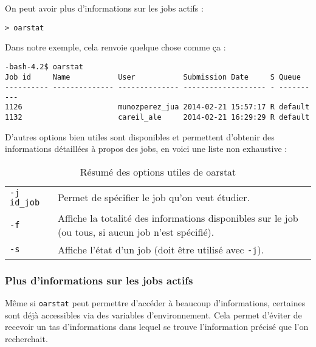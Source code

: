 \par On peut avoir plus d'informations sur les jobs actifs :
\begin{verbatim}
> oarstat
\end{verbatim}

\par Dans notre exemple, cela renvoie quelque chose comme ça :
\begin{verbatim}
-bash-4.2$ oarstat
Job id     Name           User           Submission Date     S Queue
---------- -------------- -------------- ------------------- - ----------
1126                      munozperez_jua 2014-02-21 15:57:17 R default   
1132                      careil_ale     2014-02-21 16:29:29 R default   
\end{verbatim}

\par D'autres options bien utiles sont disponibles et permettent d'obtenir des informations détaillées à propos des jobs, en voici une liste non exhaustive : \\

\begin{table}[h!]
  \centering

  \begin{tabular}{|lp{10cm}|}
\hline
    \texttt{-j id\_job} & Permet de spécifier le job qu'on veut étudier. \\
    \texttt{-f} & Affiche la totalité des informations disponibles sur le job (ou tous, si aucun job n'est spécifié).\\
    \texttt{-s} & Affiche l'état d'un job (doit être utilisé avec \texttt{-j}).\\
\hline
  \end{tabular}

  \caption{Résumé des options utiles de oarstat}
  
\end{table}


\subsubsection{Plus d'informations sur les jobs actifs}
\label{sec:plus-dinf-sur}

\par Même si \texttt{oarstat} peut permettre d'accéder à beaucoup d'informations, certaines sont déjà accessibles via des variables d'environnement. Cela permet d'éviter de recevoir un tas d'informations dans lequel se trouve l'information précisé que l'on recherchait.

